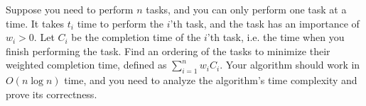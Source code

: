 \problem{}
Suppose you need to perform $n$ tasks, and you can only perform one task at a time.  It takes $t_i$ time to perform the $i$'th task, and the task has an importance of $w_i > 0$.  Let $C_i$ be the completion time of the $i$'th task, i.e. the time when you finish performing the task.  Find an ordering of the tasks to minimize their weighted completion time, defined as $\sum_{i=1}^{n} w_i  C_i$.  Your algorithm should work in $O(n\log{n})$ time, and you need to analyze the algorithm's time complexity and prove its correctness. 

\solution{}
















\newpage